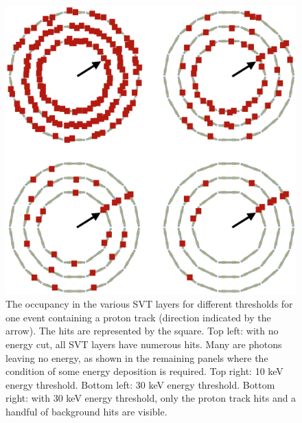 \begin{figure}
	\centering
	\includegraphics[width=0.99\columnwidth,keepaspectratio]{img/bstHitDisplay.png}
	\caption{The occupancy in the various SVT layers for different thresholds for one event containing a proton track (direction indicated
             by the arrow). The hits are represented by the square.
             Top left: with no energy cut, all SVT layers have numerous hits. Many are photons leaving no energy, as shown in
             the remaining panels where the condition of some energy deposition is required. Top right: 10 keV energy threshold.
             Bottom left: 30 keV energy threshold.
             Bottom right: with 30 keV energy threshold, only the proton track hits and a handful of background hits are visible.}
	\label{fig:radStudyThreshold}
\end{figure}




